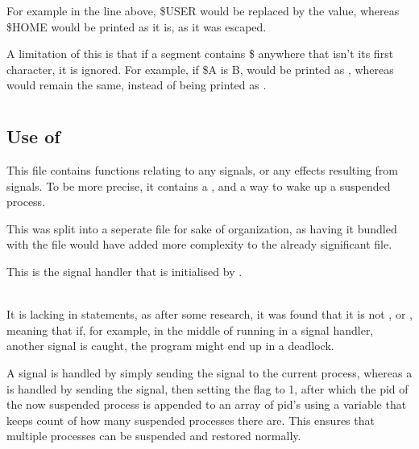 \documentclass[12pt, a4paper]{report}
\begin{document}
                For example in the line above, \$USER would be replaced by the value,
                whereas \$HOME would be printed as it is, as it was escaped.

                A limitation of this is that if a segment contains \$ anywhere that isn't
                its first character, it is ignored. For example, if \$A is B, 
                would be printed as , whereas  would remain
                the same, instead of being printed as .

                \clearpage
            
        \section{}
            \subsection{Use of }
                This file contains functions relating to any signals, or any effects
                resulting from signals. To be more precise, it contains a ,
                and a way to wake up a suspended process.

                This was split into a seperate file for sake of organization, as having it
                bundled with the  file would have added more complexity
                to the already significant file.

                This is the signal handler that is initialised by .
                
                \begingroup
                    \fontsize{10pt}{10pt}\selectfont
                \endgroup\\[-30pt]
                It is lacking in  statements, as after some research,
                it was found that it is not , or ,
                meaning that if, for example, in the middle of running 
                in a signal handler, another signal is caught, the program might 
                end up in a deadlock.

                A  signal is handled by simply sending the signal to the
                current process, whereas a  is handled by sending the
                signal, then setting the  flag to 1, after which the
                pid of the now suspended process is appended to an array of pid's
                using a variable that keeps count of how many suspended processes there are.
                This ensures that multiple processes can be suspended and restored normally.
\end{document}
